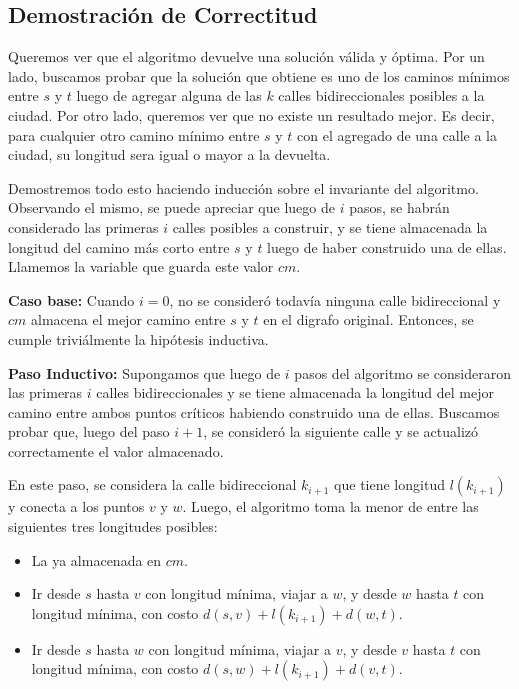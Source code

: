 \vspace{1em}

\subsection{Demostración de Correctitud}
\vspace{1em}

Queremos ver que el algoritmo devuelve una solución válida y óptima. Por un lado, buscamos probar que la solución que obtiene es uno de los caminos mínimos entre $s$ y $t$ luego de agregar alguna de las $k$ calles bidireccionales posibles a la ciudad. Por otro lado, queremos ver que no existe un resultado mejor. Es decir, para cualquier otro camino mínimo entre $s$ y $t$ con el agregado de una calle a la ciudad, su longitud sera igual o mayor a la devuelta.

\vspace{1em}

Demostremos todo esto haciendo inducción sobre el invariante del algoritmo. Observando el mismo, se puede apreciar que luego de $i$ pasos, se habrán considerado las primeras $i$ calles posibles a construir, y se tiene almacenada la longitud del camino más corto entre $s$ y $t$ luego de haber construido una de ellas. Llamemos la variable que guarda este valor $cm$. 

\vspace{1em}

\textbf{Caso base:} Cuando $i = 0$, no se consideró todavía ninguna calle bidireccional y $cm$ almacena el mejor camino entre $s$ y $t$ en el digrafo original. Entonces, se cumple triviálmente la hipótesis inductiva.

\vspace{1em}

\textbf{Paso Inductivo:} Supongamos que luego de $i$ pasos del algoritmo se consideraron las primeras $i$ calles bidireccionales y se tiene almacenada la longitud del mejor camino entre ambos puntos críticos habiendo construido una de ellas. Buscamos probar que, luego del paso $i+1$, se consideró la siguiente calle y se actualizó correctamente el valor almacenado.

\vspace{1em}

En este paso, se considera la calle bidireccional $k_{i+1}$ que tiene longitud $l(k_{i+1})$ y conecta a los puntos $v$ y $w$. Luego, el algoritmo toma la menor de entre las siguientes tres longitudes posibles:

\begin{itemize}
        \item La ya almacenada en $cm$.
        \item Ir desde $s$ hasta $v$ con longitud mínima, viajar a $w$, y desde $w$ hasta $t$ con longitud mínima, con costo $d(s,v) + l(k_{i+1}) + d(w,t)$.
        \item Ir desde $s$ hasta $w$ con longitud mínima, viajar a $v$, y desde $v$ hasta $t$ con longitud mínima, con costo $d(s,w) + l(k_{i+1}) + d(v,t)$.
\end{itemize}

